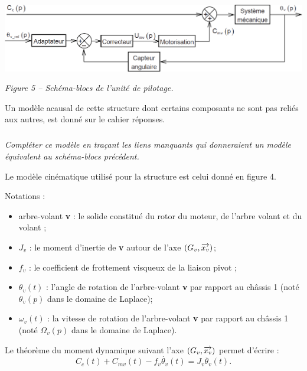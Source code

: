 \documentclass[10pt,fleqn]{article} %
\begin{document}
\begin{center}
\includegraphics[width=\linewidth]{images/fig_15}

\textit{Figure 5 -- Schéma-blocs de l'unité de pilotage.}
\end{center}

Un modèle acausal de cette structure dont certains composants ne sont pas reliés aux autres, est
donné sur le cahier réponses.

\subparagraph{}
\textit{Compléter ce modèle en traçant les liens manquants qui donneraient un modèle équivalent au
schéma-blocs précédent.}
\ifprof
\begin{corrige}
\end{corrige}
\else
\fi

\vspace{.25cm}
Le modèle cinématique utilisé pour la structure est celui donné en figure 4.

Notations :
\begin{itemize}
\item arbre-volant \textbf{v} : le solide constitué du rotor du moteur, de l'arbre volant et du volant ;
\item $J_v$ : le moment d'inertie de \textbf{v} autour de l'axe $\left( G_v,\overrightarrow{x_v}\right)$;
\item $f_v$ : le coefficient de frottement visqueux de la liaison pivot ;
\item $\theta_v(t)$ : l'angle de rotation de l'arbre-volant \textbf{v} par rapport au châssis 1 (noté $\theta_v(p)$ dans le domaine de Laplace);
\item $\omega_v(t)$ : la vitesse de rotation de l'arbre-volant \textbf{v} par rapport au châssis 1 (noté $\Omega_v(p)$ dans le
domaine de Laplace).
\end{itemize}

Le théorème du moment dynamique suivant l’axe $\left(G_v,\overrightarrow{x_v}\right)$ permet d’écrire :
$$
C_c(t)+C_{mv}(t)-f_v\dot{\theta_v}(t)=J_v\ddot{\theta_v}(t).
$$
\end{document}
